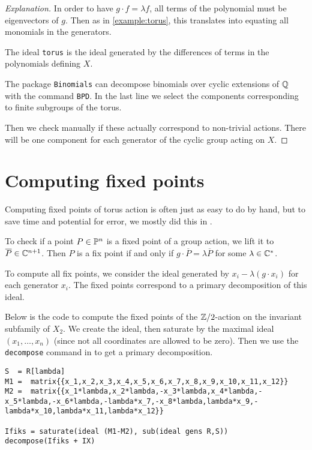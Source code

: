 \begin{proof}[Explanation]
In order to have $g \cdot f = \lambda f$, all terms of the polynomial must be eigenvectors of $g$. Then as in \cref{example:torus},  this translates into equating all monomials in the generators.

The ideal \texttt{torus} is the ideal generated by the differences of terms in the polynomials defining $X$.

The \MM package \texttt{Binomials} \cite{kahle_binomials} can decompose binomials over cyclic extensions of $\Q$ with the command \texttt{BPD}. In the last line we select the components corresponding to finite subgroups of the torus.

Then we check manually if these actually correspond to non-trivial actions. There will be one component for each generator of the cyclic group acting on $X$.
\end{proof}

\section{Computing fixed points}

Computing fixed points of torus action is often just as easy to do by hand, but to save time and potential for error, we mostly did this in \MM.

To check if a point $P \in \P^n$ is a fixed point of a group action, we lift it to $\overline{P} \in \C^{n+1}$. Then $P$ is a fix point if and only if $g \cdot \overline P = \lambda \overline P$ for some $\lambda \in \C^\ast$.

To compute all fix points, we consider the ideal generated by $x_i - \lambda (g \cdot x_i)$ for each generator $x_i$. The fixed points correspond to a primary decomposition of this ideal.

Below is the code to compute the fixed points of the $\Z/2$-action on the invariant subfamily of $X_2$. We create the ideal, then saturate by the maximal ideal $(x_1,\ldots,x_n)$ (since not all coordinates are allowed to be zero). Then we use the \texttt{decompose} command in \MM to get a primary decomposition.

\begin{lstlisting}[language=Macaulay2]
S  = R[lambda]
M1 =  matrix{{x_1,x_2,x_3,x_4,x_5,x_6,x_7,x_8,x_9,x_10,x_11,x_12}}
M2 =  matrix{{x_1*lambda,x_2*lambda,-x_3*lambda,x_4*lambda,-x_5*lambda,-x_6*lambda,-lambda*x_7,-x_8*lambda,lambda*x_9,-lambda*x_10,lambda*x_11,lambda*x_12}}

Ifiks = saturate(ideal (M1-M2), sub(ideal gens R,S))
decompose(Ifiks + IX)
\end{lstlisting}

